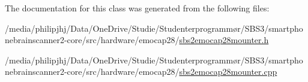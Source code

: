 The documentation for this class was generated from the following files\-:\begin{DoxyCompactItemize}
\item 
/media/philipjhj/\-Data/\-One\-Drive/\-Studie/\-Studenterprogrammør/\-S\-B\-S3/smartphonebrainscanner2-\/core/src/hardware/emocap28/\hyperlink{sbs2emocap28mounter_8h}{sbs2emocap28mounter.\-h}\item 
/media/philipjhj/\-Data/\-One\-Drive/\-Studie/\-Studenterprogrammør/\-S\-B\-S3/smartphonebrainscanner2-\/core/src/hardware/emocap28/\hyperlink{sbs2emocap28mounter_8cpp}{sbs2emocap28mounter.\-cpp}\end{DoxyCompactItemize}
